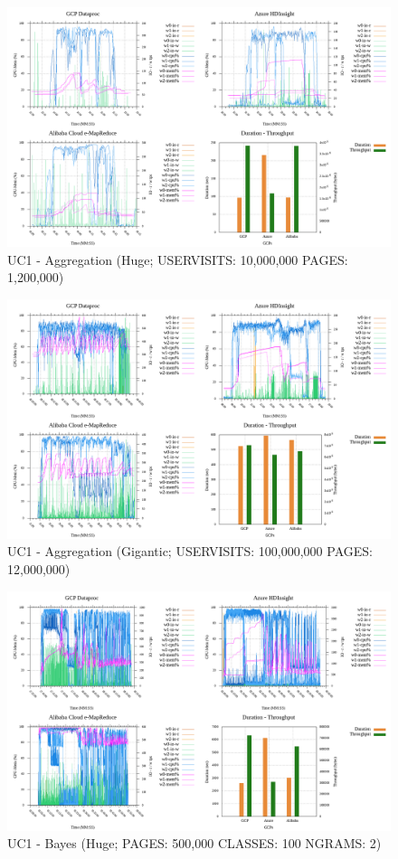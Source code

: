 \documentclass[review]{elsarticle}
\begin{document}
\begin{figure}[p]
	\caption{UC1 - Aggregation (Huge; USERVISITS: 10,000,000 PAGES: 1,200,000)}
	\label{fig:uc1-aggreg-h-cmidt}
	\includegraphics[width=\textwidth]{uc1-aggreg-h-cmidt}
	\centering
\end{figure}

\begin{figure}[p]
	\caption{UC1 - Aggregation (Gigantic; USERVISITS: 100,000,000 PAGES: 12,000,000)}
	\label{fig:uc1-aggreg-g-cmidt}
	\includegraphics[width=\textwidth]{uc1-aggreg-g-cmidt}
	\centering
\end{figure}

\begin{figure}[p]
	\caption{UC1 - Bayes (Huge; PAGES: 500,000 CLASSES: 100 NGRAMS: 2)}
	\label{fig:uc1-bayes-h-cmidt}
	\includegraphics[width=\textwidth]{uc1-bayes-h-cmidt}
	\centering
\end{figure}
\end{document}
